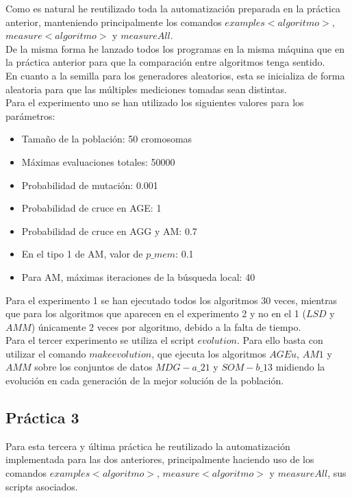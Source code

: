 \documentclass[11pt,a4paper]{article}
\begin{document}
	Como es natural he reutilizado toda la automatización preparada en la práctica anterior, manteniendo principalmente los comandos $examples<algoritmo>$, $measure<algoritmo>$ y $measureAll$. \\
	
	De la misma forma he lanzado todos los programas en la misma máquina que en la práctica anterior para que la comparación entre algoritmos tenga sentido. \\
	
	En cuanto a la semilla para los generadores aleatorios, esta se inicializa de forma aleatoria para que las múltiples mediciones tomadas sean distintas. \\
	
	Para el experimento uno se han utilizado los siguientes valores para los parámetros:
	
	\begin{itemize}
		\item Tamaño de la población: 50 cromosomas
		\item Máximas evaluaciones totales: 50000
		\item Probabilidad de mutación: 0.001
		\item Probabilidad de cruce en AGE: 1
		\item Probabilidad de cruce en AGG y AM: 0.7
		\item En el tipo 1 de AM, valor de $p\_mem$: 0.1
		\item Para AM, máximas iteraciones de la búsqueda local: 40
	\end{itemize}

	Para el experimento 1 se han ejecutado todos los algoritmos 30 veces, mientras que para los algoritmos que aparecen en el experimento 2 y no en el 1 ($LSD$ y $AMM$) únicamente 2 veces por algoritmo, debido a la falta de tiempo. \\
	
	Para el tercer experimento se utiliza el script $evolution$. Para ello basta con utilizar el comando $make evolution$, que ejecuta los algoritmos $AGEu$, $AM1$ y $AMM$ sobre los conjuntos de datos $MDG-a\_21$ y $SOM-b\_13$ midiendo la evolución en cada generación de la mejor solución de la población.

	\subsection{ Práctica 3 } \label{procedimiento3}
	
	Para esta tercera y última práctica he reutilizado la automatización implementada para las dos anteriores, principalmente haciendo uso de los comandos $examples<algoritmo>$, $measure<algoritmo>$ y $measureAll$, sus scripts asociados.\\ 
	
\end{document}
